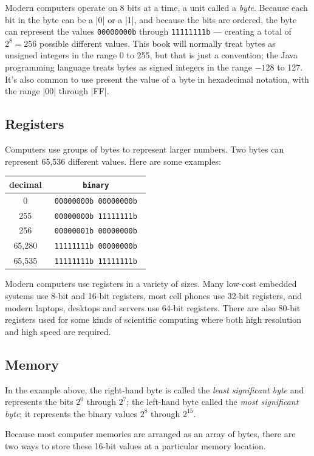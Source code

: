 Modern computers operate on 8 bits at a time, a unit called a
\emph{byte}. Because each bit in the byte can be a |0| or a |1|, and
because the bits are ordered, the byte can represent the values
\texttt{00000000b} through \texttt{11111111b} --- creating a
total of $2^8=256$ possible different values. This book will normally treat
bytes as unsigned integers in the range 0 to 255, but that is just a
convention; the Java programming language treats bytes as signed
integers in the range $-128$ to 127. It's also common to use present
the value of a byte in hexadecimal notation, with the range |00|
through |FF|.

\subsection{Registers}

Computers use groups of bytes to represent larger numbers. Two bytes
can represent 65,536 different values. Here are some examples:

\begin{tabular}{c>{\tt}c}
decimal & \textrm{binary} \\
\hline
0      & 00000000b 00000000b \\
255    & 00000000b 11111111b \\
256    & 00000001b 00000000b \\
65,280 & 11111111b 00000000b \\
65,535 & 11111111b 11111111b \\
\hline
\end{tabular}

Modern computers use registers in a variety of sizes. Many low-cost
embedded systems use 8-bit and 16-bit registers, most cell phones use
32-bit registers, and modern laptops, desktops and servers use
64-bit registers. There are also 80-bit registers used for some kinds
of scientific computing where both high resolution and high speed are required.

\subsection{Memory}

In the example above, the right-hand byte is called the \emph{least
  significant byte} and represents the bits $2^0$ through $2^7$; the
left-hand byte  called the \emph{most
significant byte}; it represents the binary values $2^8$ through
$2^{15}$. 

Because most computer memories are arranged as an array of bytes,
there are two ways to store these 16-bit values at a particular memory
location. 


